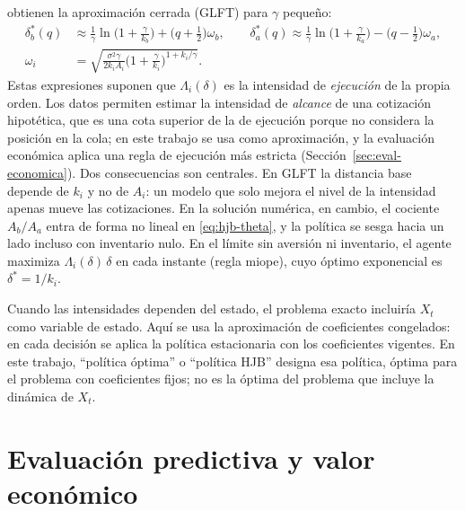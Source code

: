 \citet{GuentLehalle2013} obtienen la aproximación cerrada (GLFT) para $\gamma$ pequeño:
\begin{equation}
\begin{aligned}
 \delta^{*}_{b}(q)&\approx\tfrac1\gamma\ln\bigl(1+\tfrac{\gamma}{k_b}\bigr)+\bigl(q+\tfrac12\bigr)\omega_b,\qquad
 \delta^{*}_{a}(q)\approx\tfrac1\gamma\ln\bigl(1+\tfrac{\gamma}{k_a}\bigr)-\bigl(q-\tfrac12\bigr)\omega_a,\\
 \omega_i&=\sqrt{\tfrac{\sigma^2\gamma}{2k_iA_i}\bigl(1+\tfrac{\gamma}{k_i}\bigr)^{1+k_i/\gamma}} .
\end{aligned}
 \label{eq:glft}
\end{equation}
Estas expresiones suponen que $\Lambda_i(\delta)$ es la intensidad de \emph{ejecución} de la propia orden. Los datos permiten estimar la intensidad de \emph{alcance} de una cotización hipotética, que es una cota superior de la de ejecución porque no considera la posición en la cola; en este trabajo se usa como aproximación, y la evaluación económica aplica una regla de ejecución más estricta (Sección~\ref{sec:eval-economica}). Dos consecuencias son centrales. En GLFT la distancia base depende de $k_i$ y no de $A_i$: un modelo que solo mejora el nivel de la intensidad apenas mueve las cotizaciones. En la solución numérica, en cambio, el cociente $A_b/A_a$ entra de forma no lineal en \eqref{eq:hjb-theta}, y la política se sesga hacia un lado incluso con inventario nulo. En el límite sin aversión ni inventario, el agente maximiza $\Lambda_i(\delta)\,\delta$ en cada instante (regla miope), cuyo óptimo exponencial es $\delta^*=1/k_i$.

Cuando las intensidades dependen del estado, el problema exacto incluiría $X_t$ como variable de estado. Aquí se usa la aproximación de coeficientes congelados: en cada decisión se aplica la política estacionaria con los coeficientes vigentes. En este trabajo, ``política óptima'' o ``política HJB'' designa esa política, óptima para el problema con coeficientes fijos; no es la óptima del problema que incluye la dinámica de $X_t$.

\section{Evaluación predictiva y valor económico}
\label{sec:evaluacion-pronosticos}


